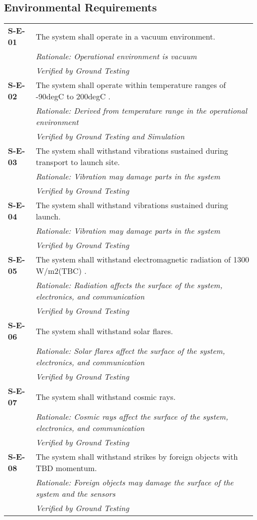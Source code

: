 \subsection{Environmental Requirements}
\vspace{-15pt}
\begin{longtable}{P{1.5cm}P{14.25cm}}
\textbf{S-E-01}	& The system shall operate in a vacuum environment.\\
& \textit{Rationale: Operational environment is vacuum}	\\
& \textit{Verified by Ground Testing}\\
\textbf{S-E-02}	& The system shall operate within temperature ranges of -90\gls{degC} to 200\gls{degC} \cite{NASAsysreq_Kumar}.\\
& \textit{Rationale: Derived from temperature range in the operational environment}	\\
& \textit{Verified by Ground Testing and Simulation}\\
\textbf{S-E-03}	& The system shall withstand vibrations sustained during transport to launch site.\\
& \textit{Rationale: Vibration may damage parts in the system}	\\
& \textit{Verified by Ground Testing}\\
\textbf{S-E-04}	& The system shall withstand vibrations sustained during launch.\\
& \textit{Rationale: Vibration may damage parts in the system}	\\
& \textit{Verified by Ground Testing}\\
\textbf{S-E-05}	& The system shall withstand electromagnetic radiation of 1300 \gls{W/m2}(\gls{TBC})  \cite{FAA_radiation}.\\
& \textit{Rationale: Radiation affects the surface of the system, electronics, and communication}	\\
& \textit{Verified by Ground Testing}\\
\textbf{S-E-06}	& The system shall withstand solar flares.\\
& \textit{Rationale: Solar flares affect the surface of the system, electronics, and communication}	\\
& \textit{Verified by Ground Testing}\\
\textbf{S-E-07}	& The system shall withstand cosmic rays.\\  
& \textit{Rationale: Cosmic rays affect the surface of the system, electronics, and communication}	\\
& \textit{Verified by Ground Testing}\\
\textbf{S-E-08}	& The system shall withstand strikes by foreign objects with \gls{TBD} momentum. \\
& \textit{Rationale: Foreign objects may damage the surface of the system and the sensors}	\\
& \textit{Verified by Ground Testing}\\
\end{longtable}
